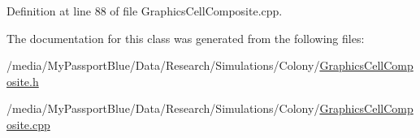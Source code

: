 \-Definition at line 88 of file \-Graphics\-Cell\-Composite.\-cpp.



\-The documentation for this class was generated from the following files\-:\begin{DoxyCompactItemize}
\item 
/media/\-My\-Passport\-Blue/\-Data/\-Research/\-Simulations/\-Colony/\hyperlink{_graphics_cell_composite_8h}{\-Graphics\-Cell\-Composite.\-h}\item 
/media/\-My\-Passport\-Blue/\-Data/\-Research/\-Simulations/\-Colony/\hyperlink{_graphics_cell_composite_8cpp}{\-Graphics\-Cell\-Composite.\-cpp}\end{DoxyCompactItemize}

